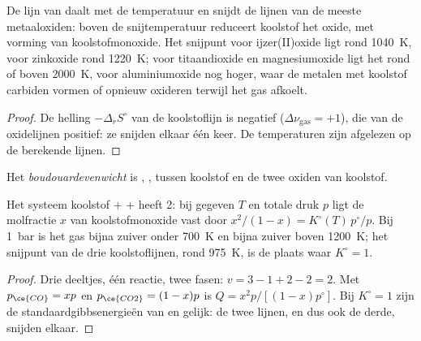 \begin{proposition}\label{prop:b2:ellingham:carbon}
De lijn van  daalt met de temperatuur en snijdt de
lijnen van de meeste metaaloxiden: boven de snijtemperatuur reduceert koolstof het
oxide, met vorming van koolstofmonoxide. Het snijpunt voor ijzer(II)oxide ligt rond
\qty{1040}{K}, voor zinkoxide rond \qty{1220}{K}; voor titaandioxide en magnesiumoxide ligt het
rond of boven \qty{2000}{K}, voor aluminiumoxide nog hoger, waar de metalen
met koolstof carbiden vormen of opnieuw oxideren terwijl het gas afkoelt.
\end{proposition}

\begin{proof}
De helling $-\Delta_r S^\circ$ van de koolstoflijn is negatief ($\Delta\nu_{\text{gas}}
= +1$), die van de oxidelijnen positief: ze snijden elkaar één keer. De temperaturen
zijn afgelezen op de berekende lijnen.
\end{proof}

\begin{definition}[Boudouardevenwicht]\label{def:b2:ellingham:boudouard}
Het \emph{boudouardevenwicht} is ,
, tussen koolstof en de twee oxiden van koolstof.
\end{definition}

\begin{proposition}\label{prop:b2:ellingham:boudouard}
Het systeem koolstof +  +  heeft  2: bij gegeven $T$ en totale
druk $p$ ligt de molfractie $x$ van koolstofmonoxide vast door $x^2/(1 - x)
= K^\circ(T)\,p^\circ/p$. Bij \qty{1}{bar} is het gas bijna zuiver 
onder \qty{700}{K} en bijna zuiver  boven \qty{1200}{K}; het snijpunt van
de drie koolstoflijnen, rond \qty{975}{K}, is de plaats waar $K^\circ = 1$.
\end{proposition}

\begin{proof}
Drie deeltjes, één reactie, twee fasen: $v = 3 - 1 + 2 - 2 = 2$. Met $p_{\ce{CO}}
= xp$ en $p_{\ce{CO2}} = (1 - x)p$ is $Q = x^2p/[(1 - x)p^\circ]$. Bij $K^\circ = 1$
zijn de standaardgibbsenergieën van  en 
gelijk: de twee lijnen, en dus ook de derde, snijden elkaar.
\end{proof}

